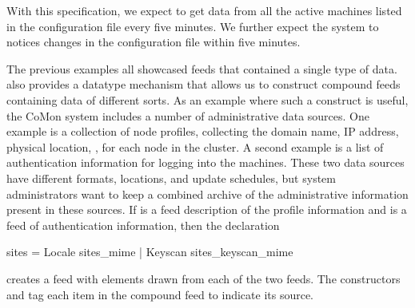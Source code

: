 With this specification, we
expect to get data from all the active machines listed in the
configuration file every five minutes.  We further expect the system to
notices changes in the configuration file within five minutes.


The previous examples all showcased feeds that contained a single type
of data.  \padsd{} also provides a datatype mechanism that allows us
to construct compound feeds containing data of different sorts.  As an
example where such a construct is useful, the CoMon system includes a
number of administrative data sources.  One example is a collection of
node profiles, collecting the domain name, IP address, physical
location, \etc, for each node in the cluster.  A second example is a
list of authentication information for logging into the machines.
These two data sources have different formats, locations, and update
schedules, but system administrators want to keep a combined archive
of the administrative information present in these sources.  If
 is a feed description of the profile
information and  is a feed of authentication
information, then the declaration
%
\begin{code}
 sites = 
    Locale  sites_mime
  | Keyscan  sites_keyscan_mime
\end{code}
%
creates a feed with elements drawn from each of the two 
feeds.  The constructors  and  tag each item in
the compound feed to indicate its source. 


